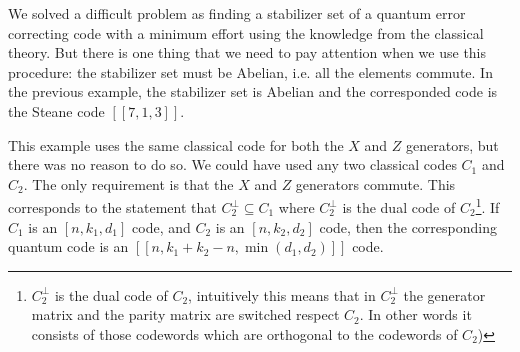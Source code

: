 We solved a difficult problem as finding a stabilizer set of a quantum error correcting code with a minimum effort using the knowledge from the classical theory.
But there is one thing that we need to pay attention when we use this procedure: the stabilizer set must be Abelian, i.e. all the elements commute.
In the previous example, the stabilizer set is Abelian and the corresponded code is the Steane code $[[7,1,3]]$.
 
This example uses the same classical code for both the $X$ and $Z$ generators, but there was no reason to do so. We could have used any two classical codes $C_{1}$ and $C_{2}$. The only requirement is that the $X$ and $Z$ generators commute. This corresponds to the statement that $C_{2}^{\perp} \subseteq C_{1}$ where $C_{2}^{\perp}$ is the dual code of $C_{2}$\footnote{$C_2^{\perp}$ is the dual code of $C_2$, intuitively this means that in $C_2^{\perp}$ the generator matrix and the parity matrix are switched respect $C_2$. In other words it consists  of those codewords which are orthogonal to the codewords of $C_{2}$)}.
If $C_{1}$ is an $\left[n, k_{1}, d_{1}\right]$ code, and $C_{2}$ is an $\left[n, k_{2}, d_{2}\right]$ code, then the corresponding quantum code is an $\left[\left[n, k_{1}+k_{2}-n, \min \left(d_{1}, d_{2}\right)\right]\right]$ code. 


